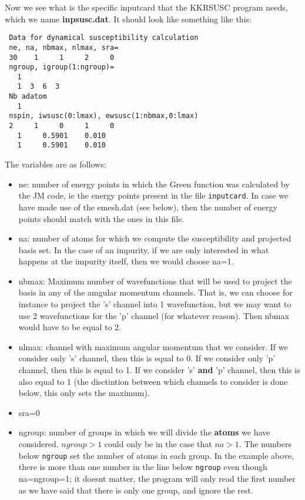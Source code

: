 \documentclass[a4paper,10pt,fullpage]{report}
\begin{document}
Now we see what is the specific inputcard that
the KKRSUSC program needs,
which we name \textbf{inpsusc.dat}. 
It should look like something like this:
\begin{verbatim}
 Data for dynamical susceptibility calculation
 ne, na, nbmax, nlmax, sra=
 30    1     1     2     0
 ngroup, igroup(1:ngroup)=
   1
   1  3  6  3
 Nb adatom
   1
 nspin, iwsusc(0:lmax), ewsusc(1:nbmax,0:lmax)
 2     1     0     1     0
   1     0.5901    0.010
   1     0.5901    0.010
\end{verbatim}
The variables are as follows:
\begin{itemize}

\item ne: number of energy points in which the Green function was calculated by
the JM code, ie the energy points present in the file \verb|inputcard|. 
In case we have made use of the emesh.dat (see below), then the number of energy points
should match with the ones in this file.

\item na: number of atoms for which we compute the susceptibility and projected basis set.
In the case of an impurity, if we are only interested in what happens at the impurity
itself, then we would choose na=1.

\item nbmax: Maximum number of wavefunctions that will be used to project the basis in 
any of the amgular momentum channels. That is, we can choose for instance to project
the 's' channel into 1 wavefunction, but we may want to use 2 wavefunctions for
the 'p' channel (for whatever reason). Then nbmax would have to be equal to 2. 

\item nlmax: channel with maximum angular momentum that we consider. 
If we consider only 's' channel, then this is equal to 0. If we consider only 'p'
channel, then this is equal to 1. If we consider 's' \textbf{and} 'p' channel, then this is also
equal to 1 (the disctintion between which channels to consider is done below, this 
only sets the maximum).

\item sra=0

\item ngroup: number of groups in which we will divide the \textbf{atoms} we have considered.
$ngroup>1$ could only be in the case that $na>1$.  The numbers below \verb|ngroup|
set the number of atoms in each group. In the example above, there is more 
than one number in the line below \verb|ngroup|
even though na=ngroup=1; it doesnt matter, the program will only read the first number
as we have said that there is only one group, and ignore the rest. 


\end{itemize}
\end{document}
